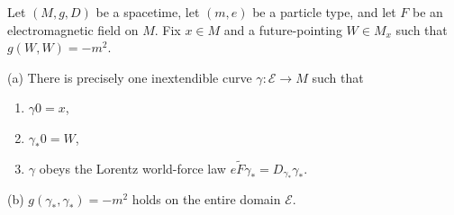 Let $(M, g, D)$ be a spacetime, let $(m, e)$ be a particle type, and let $F$ be an electromagnetic field on $M$. Fix $x \in M$ and a future-pointing $W \in M_x$ such that $g(W, W) = -m^2$.

(a) There is precisely one inextendible curve $\gamma: \mathcal{E} \rightarrow M$ such that
\begin{enumerate}
\item[(1)] $\gamma 0 = x$,
\item[(2)] $\gamma_* 0 = W$,
\item[(3)] $\gamma$ obeys the Lorentz world-force law $e\tilde{F}\gamma_* = D_{\gamma_*}\gamma_*$.
\end{enumerate}

(b) $g(\gamma_*, \gamma_*) = -m^2$ holds on the entire domain $\mathcal{E}$.
